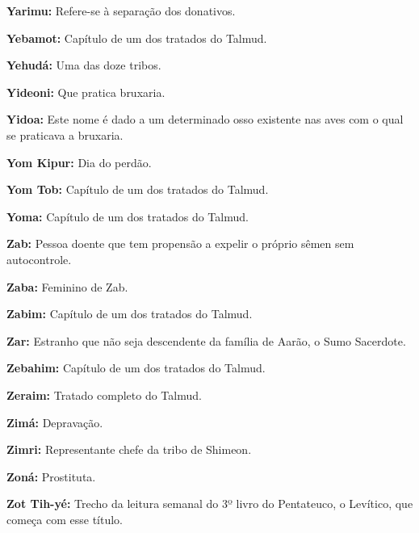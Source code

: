 \begin{hangparas}{.25in}{1}
{\textbf{Yarimu:} Refere-se à separação dos donativos.

\textbf{Yebamot:} Capítulo de um dos tratados do Talmud.

\textbf{Yehudá:} Uma das doze tribos.

\textbf{Yideoni:} Que pratica bruxaria.

\textbf{Yidoa:} Este nome é dado a um determinado osso existente nas aves com o qual se praticava a bruxaria.

\textbf{Yom Kipur:} Dia do perdão.

\textbf{Yom Tob:} Capítulo de um dos tratados do Talmud.

\textbf{Yoma:} Capítulo de um dos tratados do Talmud.

\textbf{Zab:} Pessoa doente que tem propensão a expelir o próprio
sêmen sem autocontrole.

\textbf{Zaba:} Feminino de Zab.

\textbf{Zabim:} Capítulo de um dos tratados do Talmud.

\textbf{Zar:} Estranho que não seja descendente da família de Aarão, o
Sumo Sacerdote.

\textbf{Zebahim:} Capítulo de um dos tratados do Talmud.

\textbf{Zeraim:} Tratado completo do Talmud.

\textbf{Zimá:} Depravação.

\textbf{Zimri:} Representante chefe da tribo de Shimeon.

\textbf{Zoná:} Prostituta.

\textbf{Zot Tih-yé:} Trecho da leitura semanal do 3º livro do
Pentateuco, o Levítico, que começa com esse título.
}
\end{hangparas}

